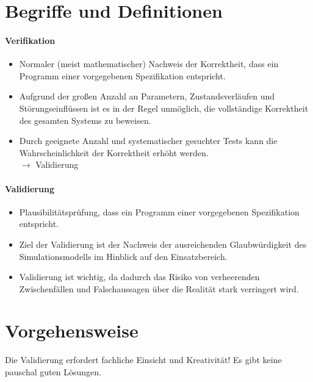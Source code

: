     \section{Begriffe und Definitionen} %
        \paragraph{Verifikation}
	        \begin{itemize}
	        	\item Normaler (meist mathematischer) Nachweis der Korrektheit, dass ein Programm einer vorgegebenen Spezifikation entspricht.
	        	\item Aufgrund der großen Anzahl an Parametern, Zustandsverläufen und Störungseinflüssen ist es in der Regel unmöglich, die vollständige Korrektheit des gesamten Systems zu beweisen.
	        	\item Durch geeignete Anzahl und systematischer gesuchter Tests kann die Wahrscheinlichkeit der Korrektheit erhöht werden. \\ \( \rightarrow \) Validierung
	        \end{itemize}
        
        \paragraph{Validierung}
	        \begin{itemize}
	        	\item Plausibilitätsprüfung, dass ein Programm einer vorgegebenen Spezifikation entspricht.
	        	\item Ziel der Validierung ist der Nachweis der ausreichenden Glaubwürdigkeit des Simulationsmodells im Hinblick auf den Einsatzbereich.
	        	\item Validierung ist wichtig, da dadurch das Risiko von verheerenden Zwischenfällen und Falschaussagen über die Realität stark verringert wird.
        	\end{itemize}

    \section{Vorgehensweise} %
        Die Validierung erfordert fachliche Einsicht und Kreativität! Es gibt keine pauschal guten Lösungen.

